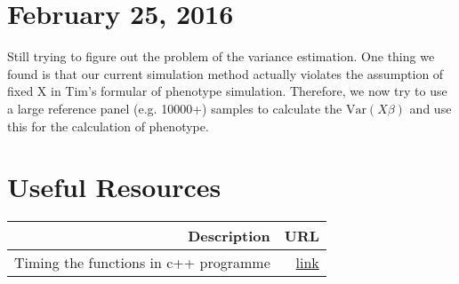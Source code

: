 \documentclass[12pt]{article}
\begin{document}
	\section{February 25, 2016}
	Still trying to figure out the problem of the variance estimation. 
	One thing we found is that our current simulation method actually violates the assumption of fixed X in Tim's formular of phenotype simulation.
	Therefore, we now try to use a large reference panel (e.g. 10000+) samples to calculate the $\mathrm{Var}(X\beta)$ and use this for the calculation of phenotype.
	\newpage
	\section{Useful Resources}
	\begin{table}[t]
		\centering
		\begin{tabular}{rr}
			\toprule
			Description & URL \\
			\midrule
			Timing the functions in c++ programme & \href{http://stackoverflow.com/a/21995693}{link}\\
			\bottomrule
		\end{tabular}
	\end{table}
\end{document}
